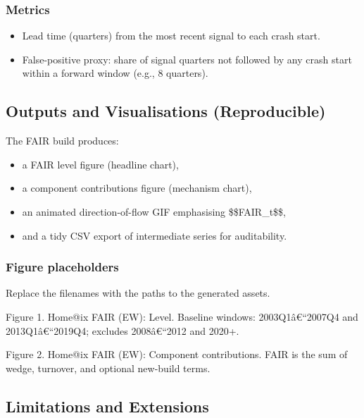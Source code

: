 \subsubsection{Metrics}\label{metrics-1}

\begin{itemize}
\tightlist
\item
  Lead time (quarters) from the most recent signal to each crash start.
\item
  False-positive proxy: share of signal quarters not followed by any
  crash start within a forward window (e.g., 8 quarters).
\end{itemize}

\subsection{Outputs and Visualisations
(Reproducible)}\label{outputs-and-visualisations-reproducible-1}

The FAIR build produces:

\begin{itemize}
\tightlist
\item
  a FAIR level figure (headline chart),
\item
  a component contributions figure (mechanism chart),
\item
  an animated direction-of-flow GIF emphasising \$\$\Delta FAIR\_t\$\$,
\item
  and a tidy CSV export of intermediate series for auditability.
\end{itemize}

\subsubsection{Figure placeholders}\label{figure-placeholders}

Replace the filenames with the paths to the generated assets.

Figure 1. Home@ix FAIR (EW): Level. Baseline windows: 2003Q1â€``2007Q4
and 2013Q1â€``2019Q4; excludes 2008â€``2012 and 2020+.

Figure 2. Home@ix FAIR (EW): Component contributions. FAIR is the sum of
wedge, turnover, and optional new-build terms.

\subsection{Limitations and
Extensions}\label{limitations-and-extensions-1}


